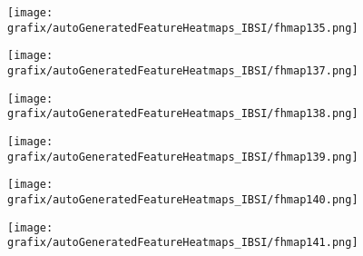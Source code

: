 \hspace{\hsp} 
\begin{subfigure}{\wid\textwidth} 
    \centering 
    \caption{\tiny \sffamily {}} 
    \vspace{\vsp} 
    \texttt{[image: grafix/autoGeneratedFeatureHeatmaps\_IBSI/fhmap135.png]} 
\end{subfigure} 
\hspace{\hsp} 
\begin{subfigure}{\wid\textwidth} 
    \centering 
    \caption{\small \sffamily {}} 
\end{subfigure} 
\hspace{\hsp} 
\begin{subfigure}{\wid\textwidth} 
    \centering 
    \caption{\tiny \sffamily {}} 
    \vspace{\vsp} 
    \texttt{[image: grafix/autoGeneratedFeatureHeatmaps\_IBSI/fhmap137.png]} 
\end{subfigure} 
\hspace{\hsp} 
\begin{subfigure}{\wid\textwidth} 
    \centering 
    \caption{\tiny \sffamily {}} 
    \vspace{\vsp} 
    \texttt{[image: grafix/autoGeneratedFeatureHeatmaps\_IBSI/fhmap138.png]} 
\end{subfigure} 
\hspace{\hsp} 
\begin{subfigure}{\wid\textwidth} 
    \centering 
    \caption{\tiny \sffamily {}} 
    \vspace{\vsp} 
    \texttt{[image: grafix/autoGeneratedFeatureHeatmaps\_IBSI/fhmap139.png]} 
\end{subfigure} 
\hspace{\hsp} 
\begin{subfigure}{\wid\textwidth} 
    \centering 
    \caption{\tiny \sffamily {}} 
    \vspace{\vsp} 
    \texttt{[image: grafix/autoGeneratedFeatureHeatmaps\_IBSI/fhmap140.png]} 
\end{subfigure} 
\hspace{\hsp} 
\begin{subfigure}{\wid\textwidth} 
    \centering 
    \caption{\tiny \sffamily {}} 
    \vspace{\vsp} 
    \texttt{[image: grafix/autoGeneratedFeatureHeatmaps\_IBSI/fhmap141.png]} 
\end{subfigure} 
